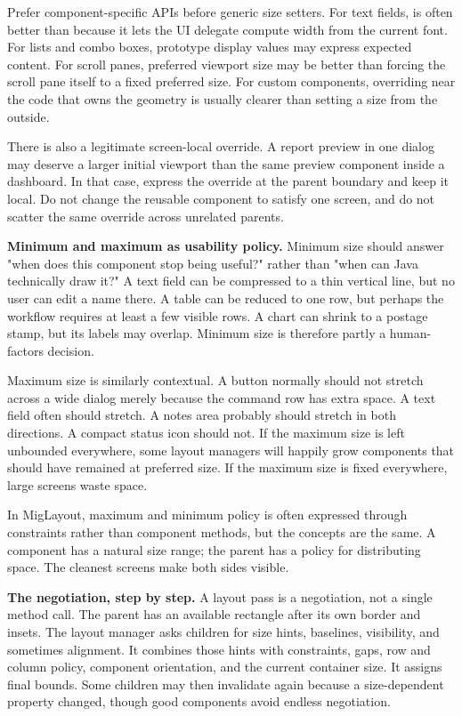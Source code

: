Prefer component-specific APIs before generic size setters. For text fields,
 is often better than  because it lets the
UI delegate compute width from the current font. For lists and combo boxes,
prototype display values may express expected content. For scroll panes,
preferred viewport size may be better than forcing the scroll pane itself to a
fixed preferred size. For custom components, overriding 
near the code that owns the geometry is usually clearer than setting a size from
the outside.

There is also a legitimate screen-local override. A report preview in one
dialog may deserve a larger initial viewport than the same preview component
inside a dashboard. In that case, express the override at the parent boundary
and keep it local. Do not change the reusable component to satisfy one screen,
and do not scatter the same override across unrelated parents.

\textbf{Minimum and maximum as usability policy.} Minimum size should answer "when does this component stop being useful?" rather
than "when can Java technically draw it?" A text field can be compressed to a
thin vertical line, but no user can edit a name there. A table can be reduced to
one row, but perhaps the workflow requires at least a few visible rows. A chart
can shrink to a postage stamp, but its labels may overlap. Minimum size is
therefore partly a human-factors decision.

Maximum size is similarly contextual. A button normally should not stretch
across a wide dialog merely because the command row has extra space. A text
field often should stretch. A notes area probably should stretch in both
directions. A compact status icon should not. If the maximum size is left
unbounded everywhere, some layout managers will happily grow components that
should have remained at preferred size. If the maximum size is fixed everywhere,
large screens waste space.

In MigLayout, maximum and minimum policy is often expressed through constraints
rather than component methods, but the concepts are the same. A component has a
natural size range; the parent has a policy for distributing space. The cleanest
screens make both sides visible.

\textbf{The negotiation, step by step.} A layout pass is a negotiation, not a single method call. The parent has an
available rectangle after its own border and insets. The layout manager asks
children for size hints, baselines, visibility, and sometimes alignment. It
combines those hints with constraints, gaps, row and column policy, component
orientation, and the current container size. It assigns final bounds. Some
children may then invalidate again because a size-dependent property changed,
though good components avoid endless negotiation.

